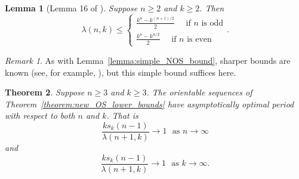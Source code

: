 \documentclass[a4paper,11pt]{article}
\theoremstyle{plain}
\newtheorem{lemma}{Lemma}[section]
\newtheorem{theorem}[lemma]{Theorem}
\theoremstyle{definition}
\theoremstyle{remark}
\newtheorem{remark}{Remark}[section]
\begin{document}
\begin{lemma}[Lemma 16 of \cite{Burns93}]  \label{lemma:simple_OS_bound}
Suppose $n\geq2$ and $k\geq2$. Then
\[
\lambda(n,k) \leq \left\{
\begin{aligned}
\frac{k^n - k^{(n+1)/2}}{2} \text{~~~~if $n$ is odd} \\
\frac{k^n - k^{n/2}}{2}     \text{~~~~if $n$ is even}
\end{aligned} \right..
\]
\end{lemma}

\begin{remark}
As with Lemma~\ref{lemma:simple_NOS_bound}, sharper bounds are known (see, for example,
\cite[Theorem 2.13]{Mitchell26}), but this simple bound suffices here.
\end{remark}

\begin{theorem}
Suppose $n\geq3$ and $k\geq3$. The orientable sequences of
Theorem~\ref{theorem:new_OS_lower_bounds} have asymptotically optimal period with respect to both
$n$ and $k$.  That is
\[ \frac{ks_k(n-1)}{\lambda(n+1,k)}\rightarrow 1 \text{~~as~}n\rightarrow\infty \]
and
\[ \frac{ks_k(n-1)}{\lambda(n+1,k)}\rightarrow 1 \text{~~as~}k\rightarrow\infty. \]
\end{theorem}
\end{document}
